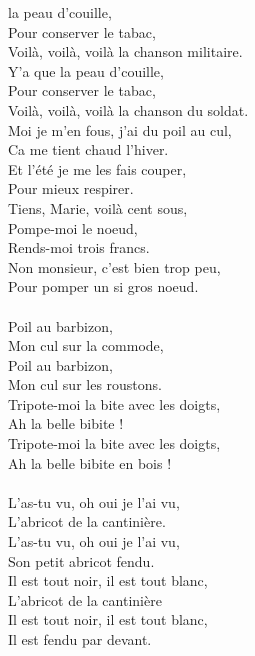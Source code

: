 
 la peau d'couille, 
\\Pour conserver le tabac,
\\Voilà, voilà, voilà la chanson militaire.
\\Y'a que la peau d'couille,
\\Pour conserver le tabac,
\\Voilà, voilà, voilà la chanson du soldat.
\\Moi je m'en fous, j'ai du poil au cul,
\\Ca me tient chaud l'hiver.
\\Et l'été je me les fais couper,
\\Pour mieux respirer.
\\Tiens, Marie, voilà cent sous,
\\Pompe-moi le noeud,
\\Rends-moi trois francs.
\\Non monsieur, c'est bien trop peu,
\\Pour pomper un si gros noeud.
\\\\Poil au barbizon, 
\\Mon cul sur la commode,
\\Poil au barbizon, 
\\Mon cul sur les roustons.
\\Tripote-moi la bite avec les doigts,
\\Ah la belle bibite !
\\Tripote-moi la bite avec les doigts,
\\Ah la belle bibite en bois !
\\\\L'as-tu vu, oh oui je l'ai vu,
\\L'abricot de la cantinière.
\\L'as-tu vu, oh oui je l'ai vu,
\\Son petit abricot fendu.
\\Il est tout noir, il est tout blanc,
\\L'abricot de la cantinière
\\Il est tout noir, il est tout blanc,
\\Il est fendu par devant.
